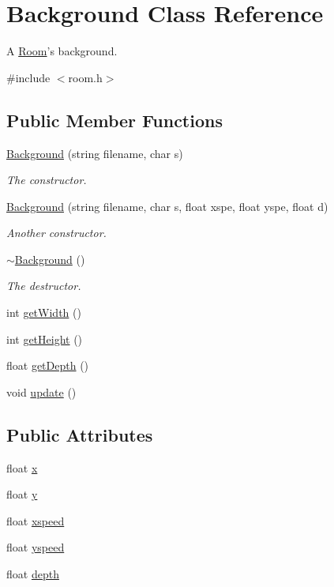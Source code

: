 \hypertarget{class_background}{\section{Background Class Reference}
\label{class_background}
}


A \hyperlink{class_room}{Room}'s background.  




{\ttfamily \#include $<$room.\-h$>$}

\subsection*{Public Member Functions}
\begin{DoxyCompactItemize}
\item 
\hyperlink{class_background_a929e270a8ddd85e11ed2ad3047bb950e}{Background} (string filename, char s)
\begin{DoxyCompactList}\small\item\em The constructor. \end{DoxyCompactList}\item 
\hyperlink{class_background_a753b5718d40416da2762ae25aa18d6e8}{Background} (string filename, char s, float xspe, float yspe, float d)
\begin{DoxyCompactList}\small\item\em Another constructor. \end{DoxyCompactList}\item 
\hyperlink{class_background_a36754df1deb720393217ade59da41557}{$\sim$\-Background} ()
\begin{DoxyCompactList}\small\item\em The destructor. \end{DoxyCompactList}\item 
int \hyperlink{class_background_a5b52f684a9a71e4604df4e3cc2ac4cc1}{get\-Width} ()
\item 
int \hyperlink{class_background_a4f05317c68fcdfd675f40d043eb89f4c}{get\-Height} ()
\item 
float \hyperlink{class_background_a07f47ff11dea75b93db524f1ac8bcef2}{get\-Depth} ()
\item 
void \hyperlink{class_background_acab58b65d4299d4bd51b8376e8c3e3d3}{update} ()
\end{DoxyCompactItemize}
\subsection*{Public Attributes}
\begin{DoxyCompactItemize}
\item 
float \hyperlink{class_background_af6650023418d2982420370f87eeff2de}{x}
\item 
float \hyperlink{class_background_adb462ce7dc04d3b09698f1baa3d173e6}{y}
\item 
float \hyperlink{class_background_a9519d783cf9640d9889a79424bab2f4e}{xspeed}
\item 
float \hyperlink{class_background_a7335929df2f4e7fbd31014d8f14a4b81}{yspeed}
\item 
float \hyperlink{class_background_a5df71997c2d1628f4e2d6d9c1cd08e08}{depth}
\end{DoxyCompactItemize}
